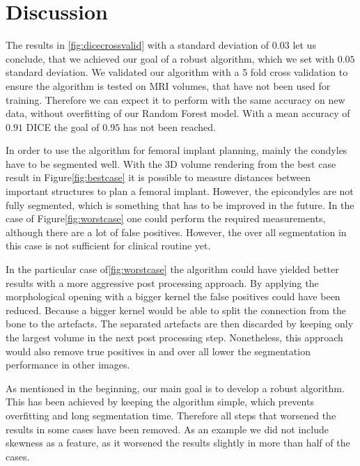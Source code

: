 \section{Discussion}
The results in \autoref{fig:dicecrossvalid} with a standard deviation of $0.03$ let us conclude, that we achieved our goal of a robust algorithm, which we set with $0.05$ standard deviation. We validated our algorithm with a 5 fold cross validation to ensure the algorithm is tested on MRI volumes, that have not been used for training. Therefore we can expect it to perform with the same accuracy on new data, without overfitting of our Random Forest model. With a mean accuracy of $0.91$ DICE the goal of $0.95$ has not been reached. 

In order to use the algorithm for femoral implant planning, mainly the condyles have to be segmented well. With the 3D volume rendering from the best case result in Figure\autoref{fig:bestcase} it is possible to measure distances between important structures to plan a femoral implant. However, the epicondyles are not fully segmented, which is something that has to be improved in the future. In the case of Figure\autoref{fig:worstcase} one could perform the required measurements, although there are a lot of false positives. However, the over all segmentation in this case is not sufficient for clinical routine yet.

In the particular case of\autoref{fig:worstcase} the algorithm could have yielded better results with a more aggressive post processing approach. By applying the morphological opening with a bigger kernel the false positives could have been reduced. Because a bigger kernel would be able to split the connection from the bone to the artefacts. The separated artefacts are then discarded by keeping only the largest volume in the next post processing step. Nonetheless, this approach would also remove true positives in and over all lower the segmentation performance in other images. 

As mentioned in the beginning, our main goal is to develop a robust algorithm. This has been achieved by keeping the algorithm simple, which prevents overfitting and long segmentation time. Therefore all steps that worsened the results in some cases have been removed. As an example we did not include skewness as a feature, as it worsened the results slightly in more than half of the cases.